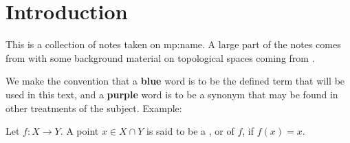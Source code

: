 \chapter*{Introduction}
This is a collection of notes taken on {mp:name}. A large part of
the notes comes from \cite{lee2013smooth} with some background material on
topological spaces coming from \cite{munkres2000topology}.

We make the convention that a \textbf{\textcolor{jd_blue}{blue}} word is
to be the defined term that will be used in this text, and a
\textbf{\textcolor{jd_purple}{purple}} word is to be a synonym that may be found
in other treatments of the subject. Example:
\begin{define*}
    Let $f: X \to Y$. A point $x \in X \cap Y$ is said to be a
    , or  of $f$, if
    $f(x) = x$.
\end{define*}